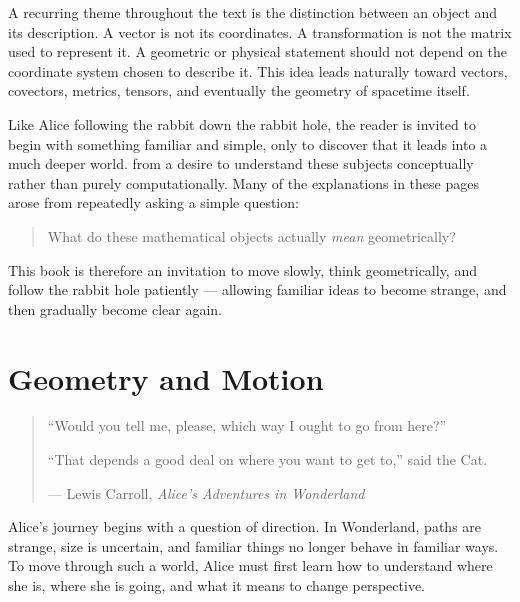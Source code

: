 \documentclass[11pt,openany]{book}
\theoremstyle{definition}
\begin{document}
\medskip

A recurring theme throughout the text is the distinction between an object and its
description. A vector is not its coordinates. A transformation is not the matrix used
to represent it. A geometric or physical statement should not depend on the coordinate
system chosen to describe it. This idea leads naturally toward vectors, covectors,
metrics, tensors, and eventually the geometry of spacetime itself.

\medskip

Like Alice following the rabbit down the rabbit hole, the reader is invited to begin with something familiar and simple, only to discover that it leads into a much deeper world.
from a desire to understand these subjects conceptually rather than purely computationally.
Many of the explanations in these pages arose from repeatedly asking a simple question:

\begin{quote}
What do these mathematical objects actually \textit{mean} geometrically?
\end{quote}

\medskip



This book is therefore an invitation to move slowly, think geometrically, and follow the
rabbit hole patiently --- allowing familiar ideas to become strange, and then gradually
become clear again.
\tableofcontents

\mainmatter

\part{Geometry and Motion}



\vspace*{0.35\textheight}

\begin{quote}
\centering
``Would you tell me, please, which way I ought to go from here?''

\medskip

``That depends a good deal on where you want to get to,'' said the Cat.

\medskip

--- Lewis Carroll, \textit{Alice's Adventures in Wonderland}
\end{quote}


Alice's journey begins with a question of direction. In Wonderland, paths are strange,
size is uncertain, and familiar things no longer behave in familiar ways. To move through
such a world, Alice must first learn how to understand where she is, where she is going,
and what it means to change perspective.
\end{document}
